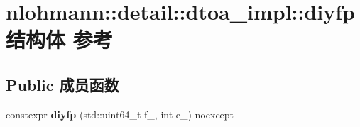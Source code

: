 \hypertarget{structnlohmann_1_1detail_1_1dtoa__impl_1_1diyfp}{}\section{nlohmann\+::detail\+::dtoa\+\_\+impl\+::diyfp结构体 参考}
\label{structnlohmann_1_1detail_1_1dtoa__impl_1_1diyfp}
\subsection*{Public 成员函数}
\begin{DoxyCompactItemize}
\item 
\mbox{\label{structnlohmann_1_1detail_1_1dtoa__impl_1_1diyfp_ad8798a8823a49c8412f0fada9892c918}} 
constexpr {\bfseries diyfp} (std\+::uint64\+\_\+t f\+\_\+, int e\+\_\+) noexcept
\end{DoxyCompactItemize}
